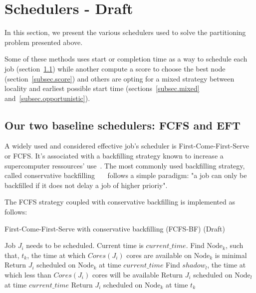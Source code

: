 \documentclass[conference,10pt]{IEEEtran}
\newcommand{\Node}[1]{\ensuremath{\mathrm{Node}_{#1}}\xspace}
\newcommand{\core}{\mathit{Cores}\xspace}
\newcommand{\walltime}{\mathit{Walltime}\xspace}
\newcommand{\nodeset}{\ensuremath{\mathbb{N}}\xspace}
\begin{document}

\section{Schedulers - Draft}\label{sec.schedulers}

In this section, we present the various schedulers used to solve
the partitioning problem presented above. 

Some of these methods uses start or completion time as a way to
schedule each job (section~\ref{subsec.fcfs_eft}) while another compute 
a score to choose the best node (section~\ref{subsec.score}) and others
are opting for a mixed strategy between locality and earliest possible start time
(sections~\ref{subsec.mixed} and~\ref{subsec.opportunistic}).

\subsection{Our two baseline schedulers: FCFS and EFT}\label{subsec.fcfs_eft}

A widely used and considered effective job's scheduler is 
First-Come-First-Serve or FCFS.
It's associated with a backfilling strategy known to increase
a supercomputer ressources' use~\cite{maui}. 
The most commonly used backfilling strategy, called conservative 
backfilling~\cite{Characterization_of_Backfilling}~\cite{slurm_website_scheduling}~\cite{Introducing-New-Backfill-based} follows
a simple paradigm: "a job can only be backfilled if it does not
delay a job of higher prioriy".

The FCFS strategy coupled with conservative backfilling is implemented as follows:
\begin{algorithm}[htbp]
	\caption{First-Come-First-Serve with conservative backfilling (FCFS-BF) (Draft)}\label{algo.fcfsbf}
	\begin{algorithmic}[1]
		\State Job $J_i$ needs to be scheduled. Current time is $current\_time$.
		\State Find $\Node{k}$, such that, $t_k$, the time at which $\core(J_i)$ cores are available on $\Node{k}$ is minimal
			\State Return $J_i$ scheduled on $\Node{k}$ at time $current\_time$
		\Else
			\ForEach{$\Node{l} \in \nodeset$}
				\State Find $shadow_l$, the time at which less than $\core(J_i)$ cores will be available
				\If{$current\_time + \walltime(J_i) \leq shadow_l$}
					\State Return $J_i$ scheduled on $\Node{l}$ at time $current\_time$
				\EndIf
			\EndFor
			\State Return $J_i$ scheduled on $\Node{k}$ at time $t_k$
		\EndIf
	\end{algorithmic}
\end{algorithm}
\end{document}
